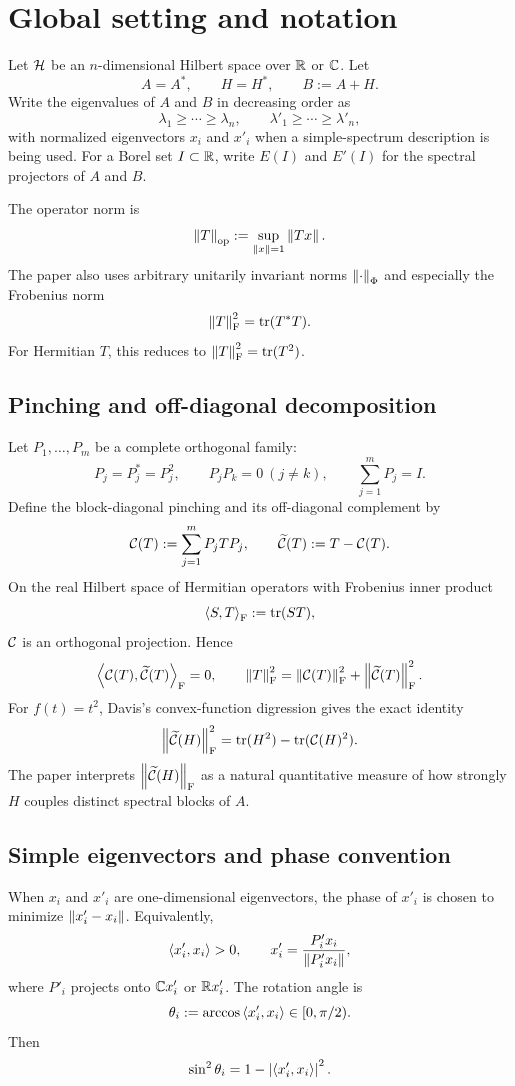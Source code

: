 \section{Global setting and notation}

Let $\mathcal{H}$ be an $n$-dimensional Hilbert space over $\mathbb{R}$ or $\mathbb{C}$. Let
\[
  A=A^*,\qquad H=H^*,\qquad B:=A+H.
\]
Write the eigenvalues of $A$ and $B$ in decreasing order as
\[
  \lambda_1\ge\cdots\ge\lambda_n,
  \qquad
  \lambda'_1\ge\cdots\ge\lambda'_n,
\]
with normalized eigenvectors $x_i$ and $x'_i$ when a simple-spectrum description is being used. For a Borel set $I\subset\mathbb{R}$, write $E(I)$ and $E'(I)$ for the spectral projectors of $A$ and $B$.

The operator norm is
\[
  \left\lVert T\right\rVert_{\mathrm{op}}:=\sup_{\left\lVert x\right\rVert=1}\left\lVert Tx\right\rVert.
\]
The paper also uses arbitrary unitarily invariant norms $\left\lVert \cdot\right\rVert_{\Phi}$ and especially the Frobenius norm
\[
  \left\lVert T\right\rVert_{\mathrm{F}}^2=\operatorname{tr}(T^*T).
\]
For Hermitian $T$, this reduces to $\left\lVert T\right\rVert_{\mathrm{F}}^2=\operatorname{tr}(T^2)$.

\subsection{Pinching and off-diagonal decomposition}

Let $P_1,\dots,P_m$ be a complete orthogonal family:
\[
  P_j=P_j^*=P_j^2,\qquad P_jP_k=0\ (j\ne k),\qquad \sum_{j=1}^mP_j=I.
\]
Define the block-diagonal pinching and its off-diagonal complement by
\[
  \mathcal{C}(T):=\sum_{j=1}^m P_jTP_j,
  \qquad
  \widetilde{\mathcal{C}}(T):=T-\mathcal{C}(T).
\]
On the real Hilbert space of Hermitian operators with Frobenius inner product
\[
  \left\langle S,T\right\rangle_{\mathrm{F}}:=\operatorname{tr}(ST),
\]
$\mathcal{C}$ is an orthogonal projection. Hence
\[
  \left\langle \mathcal{C}(T),\widetilde{\mathcal{C}}(T)\right\rangle_{\mathrm{F}}=0,
  \qquad
  \left\lVert T\right\rVert_{\mathrm{F}}^2=\left\lVert \mathcal{C}(T)\right\rVert_{\mathrm{F}}^2+\left\lVert \widetilde{\mathcal{C}}(T)\right\rVert_{\mathrm{F}}^2.
\]
For $f(t)=t^2$, Davis's convex-function digression gives the exact identity
\[
  \left\lVert \widetilde{\mathcal{C}}(H)\right\rVert_{\mathrm{F}}^2
  =\operatorname{tr}(H^2)-\operatorname{tr}(\mathcal{C}(H)^2).
\]
The paper interprets $\left\lVert \widetilde{\mathcal{C}}(H)\right\rVert_{\mathrm{F}}$ as a natural quantitative measure of how strongly $H$ couples distinct spectral blocks of $A$.

\subsection{Simple eigenvectors and phase convention}

When $x_i$ and $x'_i$ are one-dimensional eigenvectors, the phase of $x'_i$ is chosen to minimize $\left\lVert x'_i-x_i\right\rVert$. Equivalently,
\[
  \left\langle x'_i,x_i\right\rangle>0,
  \qquad
  x'_i=\frac{P'_ix_i}{\left\lVert P'_ix_i\right\rVert},
\]
where $P'_i$ projects onto $\mathbb{C} x'_i$ or $\mathbb{R} x'_i$. The rotation angle is
\[
  \theta_i:=\arccos\left\langle x'_i,x_i\right\rangle\in[0,\pi/2).
\]
Then
\[
  \sin^2\theta_i=1-\left\lvert \left\langle x'_i,x_i\right\rangle\right\rvert^2.
\]

